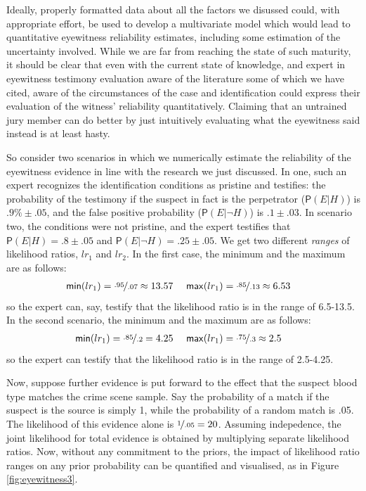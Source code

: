 \documentclass[
  10pt,
  dvipsnames,enabledeprecatedfontcommands]{scrartcl}
\newcommand{\n}{\neg}
\newcommand{\pr}[1]{\mathsf{P}(#1)}
\begin{document}
Ideally, properly formatted data about all the factors we disussed
could, with appropriate effort, be used to develop a multivariate model
which would lead to quantitative eyewitness reliability estimates,
including some estimation of the uncertainty involved. While we are far
from reaching the state of such maturity, it should be clear that even
with the current state of knowledge, and expert in eyewitness testimony
evaluation aware of the literature some of which we have cited, aware of
the circumstances of the case and identification could express their
evaluation of the witness' reliability quantitatively. Claiming that an
untrained jury member can do better by just intuitively evaluating what
the eyewitness said instead is at least hasty.

So consider two scenarios in which we numerically estimate the
reliability of the eyewitness evidence in line with the research we just
discussed. In one, such an expert recognizes the identification
conditions as pristine and testifies: the probability of the testimony
if the suspect in fact is the perpetrator (\(\pr{E\vert H}\)) is
\(.9\% \pm .05\), and the false positive probability
(\(\pr{E \vert \n H}\)) is \(.1\pm .03\). In scenario two, the
conditions were not pristine, and the expert testifies that
\(\pr{E\vert H}=.8 \pm .05\) and \(\pr{E\vert \n H}=.25 \pm .05\). We
get two different \emph{ranges} of likelihood ratios, \(lr_1\) and
\(lr_2\). In the first case, the minimum and the maximum are as follows:
\begin{align*}
\mathsf{min}(lr_1) = \nicefrac{.95}{.07} \approx 13.57  & \,\,\,\,\,\,\,\,  \mathsf{max}(lr_1) = \nicefrac{.85}{.13} \approx 6.53  
\end{align*} \noindent so the expert can, say, testify that the
likelihood ratio is in the range of 6.5-13.5. In the second scenario,
the minimum and the maximum are as follows: \begin{align*}
\mathsf{min}(lr_1) = \nicefrac{.85}{.2} =  4.25 &  \,\,\,\,\,\,\,\,   \mathsf{max}(lr_1) = \nicefrac{.75}{.3} \approx 2.5  
\end{align*} \noindent so the expert can testify that the likelihood
ratio is in the range of 2.5-4.25.

Now, suppose further evidence is put forward to the effect that the
suspect blood type matches the crime scene sample. Say the probability
of a match if the suspect is the source is simply 1, while the
probability of a random match is .05. The likelihood of this evidence
alone is \(\nicefrac{1}{.05}= 20\). Assuming indepedence, the joint
likelihood for total evidence is obtained by multiplying separate
likelihood ratios. Now, without any commitment to the priors, the impact
of likelihood ratio ranges on any prior probability can be quantified
and visualised, as in Figure \ref{fig:eyewitness3}.
\end{document}
